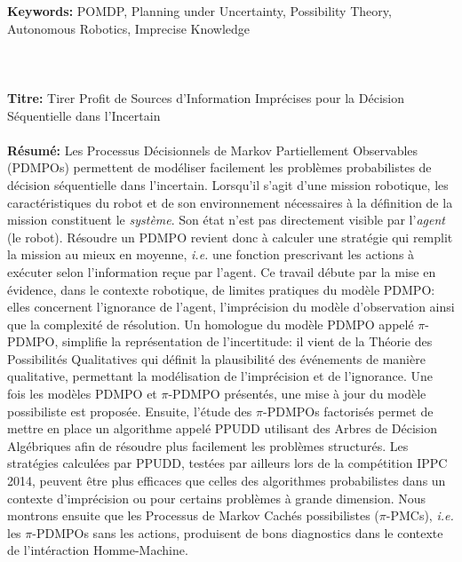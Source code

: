 \documentclass[a4paper,12pt]{article}
\begin{document}
\textbf{Keywords:} POMDP, Planning under Uncertainty, Possibility Theory, Autonomous Robotics, Imprecise Knowledge\\
\vspace{-0.9cm}
\\
\\
\\
\textbf{Titre:} Tirer Profit de Sources d'Information Impr\'ecises pour la D\'ecision S\'equentielle dans l'Incertain\\
\vspace{-0.35cm}
\\
\textbf{R\'esum\'e:} Les Processus D\'ecisionnels de Markov Partiellement Observables (PDMPOs) 
permettent de mod\'eliser facilement les probl\`emes probabilistes
de d\'ecision s\'equentielle dans l'incertain.
Lorsqu'il s'agit d'une mission robotique, 
les caract\'eristiques du robot et de son environnement
n\'ecessaires \`a la d\'efinition de la mission
constituent le \textit{syst\`eme}.
Son \'etat n'est pas directement visible par l'\textit{agent} (le robot).
R\'esoudre un PDMPO revient donc \`a calculer une strat\'egie
qui remplit la mission au mieux en moyenne,
\textit{i.e.} une fonction prescrivant les actions \`a ex\'ecuter
selon l'information re\c{c}ue par l'agent.
Ce travail d\'ebute par la mise en \'evidence, 
dans le contexte robotique,
de limites pratiques 
du mod\`ele PDMPO: 
elles concernent l'ignorance de l'agent, 
l'impr\'ecision du mod\`ele d'observation 
ainsi que la complexit\'e de r\'esolution.
Un homologue du mod\`ele PDMPO
appel\'e  $\pi$-PDMPO, 
simplifie la repr\'esentation de l'incertitude:
il vient de la Th\'eorie des Possibilit\'es Qualitatives
qui d\'efinit la plausibilit\'e des \'ev\'enements de mani\`ere qualitative,
permettant la mod\'elisation de l'impr\'ecision et de l'ignorance.
Une fois les mod\`eles PDMPO et $\pi$-PDMPO pr\'esent\'es,
une mise \`a jour du mod\`ele possibiliste est propos\'ee.
Ensuite, l'\'etude des $\pi$-PDMPOs factoris\'es 
permet de mettre en place un algorithme
appel\'e PPUDD utilisant des
Arbres de D\'ecision Alg\'ebriques
afin de r\'esoudre plus facilement les probl\`emes structur\'es.
Les strat\'egies calcul\'ees par PPUDD, 
test\'ees par ailleurs lors de la comp\'etition IPPC 2014,
peuvent \^etre plus efficaces que celles des algorithmes probabilistes 
dans un contexte d'impr\'ecision ou pour certains probl\`emes \`a grande dimension.
Nous montrons ensuite que les Processus de Markov Cach\'es possibilistes ($\pi$-PMCs),
\textit{i.e.} les $\pi$-PDMPOs sans les actions,
produisent de bons diagnostics 
dans le contexte de l'int\'eraction Homme-Machine.
\end{document}
